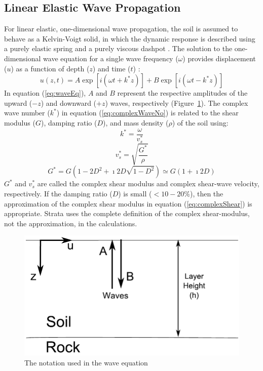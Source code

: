 \documentclass[12pt,oneside]{book}
\begin{document}
\subsection{Linear Elastic Wave Propagation}\label{ch:sra:wavePropagation}
For linear elastic, one-dimensional wave propagation, the soil is assumed to
behave as a Kelvin-Voigt solid, in which the dynamic response is described using
a purely elastic spring and a purely viscous dashpot \citep{kramer:96}.  The
solution to the one-dimensional wave equation for a single
wave frequency ($\omega$) provides displacement ($u$) as a function of depth
($z$) and time ($t$) \citep{kramer96}:
\begin{equation}
    u(z,t) = A\exp\left[i\left( \omega t + k^* z \right)\right] + B\exp\left[i\left( \omega t - k^* z
    \right)\right] 
    \label{eq:waveEq}
\end{equation}
In equation (\ref{eq:waveEq}), $A$ and $B$ represent the respective amplitudes
of the upward ($-z$) and downward ($+z$) waves, respectively
(Figure~\ref{fig:siteResponse:simpleWave}).  The complex wave number ($k^*$) in
equation (\ref{eq:complexWaveNo}) is related to the shear modulus ($G$), damping
ratio ($D$), and mass density ($\rho$) of the soil using:
\begin{equation}
    k^* = \frac{\omega}{v_s^*} %
    \label{eq:complexWaveNo}
\end{equation}
\begin{equation}
    v_s^* = \sqrt{ \frac{G^*}{\rho} } %
\end{equation}
\begin{equation}
    G^* = G \left( 1 - 2D^2 + \imath 2 D \sqrt{ 1 - D^2 }\right) 
    \simeq G ( 1 + \imath 2 D ) %
    \label{eq:complexShear}
\end{equation}
$G^*$ and $v_s^*$ are called the complex shear modulus and complex shear-wave velocity, respectively.  If the damping
ratio ($D$) is small ($<10-20\%$), then the approximation of the complex shear
modulus in equation (\ref{eq:complexShear}) is appropriate.  Strata uses the
complete definition of the complex shear-modulus, not the approximation, in the
calculations.

\begin{figure}[tb]
    \begin{center}
        \includegraphics[width=0.7\linewidth]{figures/siteResponse/simpleWave.pdf}
    \end{center}
    \caption{The notation used in the wave equation}%
    \label{fig:siteResponse:simpleWave}
\end{figure}
\end{document}
